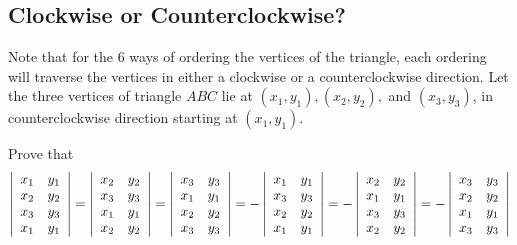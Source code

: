 \documentclass[11pt]{article}
\begin{document}
\subsection{Clockwise or Counterclockwise?}
Note that for the 6 ways of ordering the vertices of the triangle, each ordering will traverse the vertices in either a clockwise or a counterclockwise direction. 
\newline \noindent Let the three vertices of triangle $ABC$ lie at $(x_1, y_1), (x_2, y_2),$  and $(x_3, y_3)$, in counterclockwise direction starting at $(x_1, y_1)$. 

\begin{problem}  Prove that
\[\left|\begin{array}{c c} x_1 &  y_1 \\ x_2  & y_2 \\ x_3  & y_3 \\ x_1 & y_1 \\ \end{array}\right| = 
\left|\begin{array}{c c} x_2  & y_2 \\ x_3  & y_3 \\ x_1 &  y_1 \\ x_2 & y_2 \\ \end{array}\right| = 
\left|\begin{array}{c c} x_3  & y_3 \\ x_1 &  y_1 \\ x_2  & y_2 \\ x_3 & y_3 \\ \end{array}\right| = 
-\left|\begin{array}{c c}x_1 &  y_1 \\ x_3  & y_3 \\ x_2  & y_2 \\ x_1 & y_1 \\ \end{array}\right| = 
-\left|\begin{array}{c c} x_2  & y_2 \\ x_1  & y_1 \\ x_3 &  y_3 \\ x_2 & y_2 \\ \end{array}\right| = 
-\left|\begin{array}{c c} x_3  & y_3 \\ x_2 &  y_2 \\ x_1  & y_1 \\ x_3 & y_3 \\ \end{array}\right|\]
\end{problem}
\end{document}
